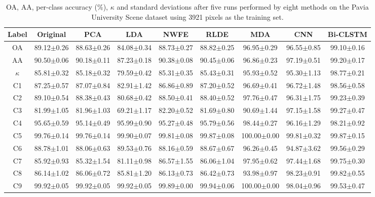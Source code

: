 \documentclass[12pt,onecolumn]{IEEEtran}
\begin{document}
\begin{spacing}{2}
\begin{table}\scriptsize
\centering
\caption{OA, AA, per-class accuracy ($\%$), $\kappa$ and standard deviations after five runs performed by eight methods on the Pavia University Scene dataset using 3921 pixels as the training set.}
\label{PUS_r}
\begin{tabular}{|c|c|c|c|c|c|c|c|c|}
\hline
Label & Original        & PCA             & LDA             & NWFE            & RLDE            & MDA             & CNN             & Bi-CLSTM       \\ \hline
OA    & 89.12$\pm$0.26  & 88.63$\pm$0.26  & 84.08$\pm$0.34  & 88.73$\pm$0.27  & 88.82$\pm$0.25  & 96.95$\pm$0.29  & 96.55$\pm$0.85  & 99.10$\pm$0.16  \\ \hline
AA    & 90.50$\pm$0.06  & 90.18$\pm$0.11  & 87.23$\pm$0.18  & 90.38$\pm$0.08  & 90.45$\pm$0.06  & 96.86$\pm$0.23  & 97.19$\pm$0.51  & 99.20$\pm$0.17  \\ \hline
$\kappa$& 85.81$\pm$0.32& 85.18$\pm$0.32  & 79.59$\pm$0.42  & 85.31$\pm$0.35  & 85.43$\pm$0.31  & 95.93$\pm$0.52  & 95.30$\pm$1.13  & 98.77$\pm$0.21\\ \hline
C1    & 87.25$\pm$0.57 & 87.07$\pm$0.84  & 82.91$\pm$1.42 & 86.86$\pm$0.89 & 87.20$\pm$0.52  & 96.69$\pm$0.41  & 96.72$\pm$1.48 & 98.56$\pm$0.58  \\ \hline
C2    & 89.10$\pm$0.54 & 88.38$\pm$0.43 & 80.68$\pm$0.42  & 88.50$\pm$0.41 & 88.40$\pm$0.52  & 97.76$\pm$0.47     & 96.31$\pm$1.75  & 99.23$\pm$0.39 \\ \hline
C3    & 81.99$\pm$1.05 & 81.96$\pm$1.03 & 69.21$\pm$1.17 & 82.20$\pm$0.52  & 81.69$\pm$0.80 & 90.69$\pm$1.44    & 97.15$\pm$1.58  & 99.27$\pm$0.47 \\ \hline
C4    & 95.65$\pm$0.59 & 95.14$\pm$0.49 & 95.99$\pm$0.90 & 95.27$\pm$0.48  & 95.79$\pm$0.56 & 98.44$\pm$0.27     & 96.16$\pm$1.29 & 98.21$\pm$0.92  \\ \hline
C5    & 99.76$\pm$0.14  & 99.76$\pm$0.14  & 99.90$\pm$0.07  & 99.81$\pm$0.08  & 99.87$\pm$0.08  & 100.00$\pm$0.00  & 99.81$\pm$0.32  & 99.87$\pm$0.15 \\ \hline
C6    & 88.78$\pm$1.01 & 88.06$\pm$0.63 & 89.53$\pm$0.76 & 88.16$\pm$0.59 & 88.67$\pm$0.67 & 96.26$\pm$0.45      & 94.87$\pm$3.62  & 99.56$\pm$0.29 \\ \hline
C7    & 85.92$\pm$0.93  & 85.32$\pm$1.54  & 81.11$\pm$0.98 & 86.57$\pm$1.55 & 86.06$\pm$1.04 & 97.95$\pm$0.62    & 97.44$\pm$1.68 & 99.75$\pm$0.30 \\ \hline
C8    & 86.14$\pm$1.02 & 86.06$\pm$0.72 & 85.81$\pm$1.20  & 86.13$\pm$0.73 & 86.42$\pm$0.73 & 93.98$\pm$0.97      & 98.23$\pm$0.91 & 99.82$\pm$0.55\\ \hline
C9    & 99.92$\pm$0.05  & 99.92$\pm$0.05  & 99.92$\pm$0.05  & 99.89$\pm$0.00  & 99.94$\pm$0.06 & 100.00$\pm$0.00  &98.04$\pm$0.96  & 99.53$\pm$0.47 \\ \hline
\end{tabular}
\end{table}


\end{spacing}
\end{document}
